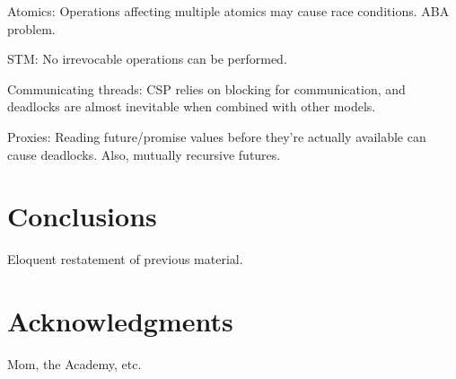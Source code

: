 \documentclass{sig-alternate}
\begin{document}
Atomics: Operations affecting multiple atomics may cause race conditions. ABA problem.

STM: No irrevocable operations can be performed.

Communicating threads: CSP relies on blocking for communication, and deadlocks are almost inevitable when combined with other models.

Proxies: Reading future/promise values before they're actually available can cause deadlocks. Also, mutually recursive futures.

\section{Conclusions}

Eloquent restatement of previous material.

\section*{Acknowledgments}

Mom, the Academy, etc.

\printbibliography{}
\end{document}
